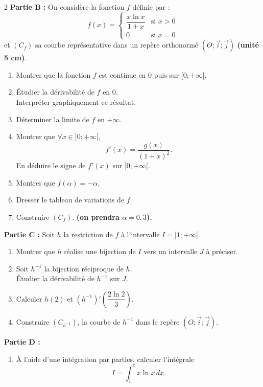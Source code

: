 \documentclass[12pt,a4paper]{article}
\begin{document}
\begin{multicols}{2}
\textbf{Partie B :} On considère la fonction \( f \) définie par :
\[
f(x) = 
\begin{cases}
\dfrac{x \ln x}{1 + x} & \text{si } x > 0 \\
0 & \text{si } x = 0
\end{cases}
\]
et \( (C_f) \) sa courbe représentative dans un repère orthonormé \( (O ; \vec{i} ; \vec{j}) \) \textbf{(unité 5 cm)}.

\begin{enumerate}
    \item Montrer que la fonction \( f \) est continue en 0 puis sur \( [0 ; +\infty[ \).
    \item Étudier la dérivabilité de \( f \) en 0.\\
    Interpréter graphiquement ce résultat.
    \item Déterminer la limite de \( f \) en \( +\infty \).
    \item Montrer que \( \forall x \in ]0 ; +\infty[ \),
    \[
    f'(x) = \dfrac{g(x)}{(1 + x)^2}.
    \]
    En déduire le signe de \( f'(x) \) sur \( ]0 ; +\infty[ \).
    \item Montrer que \( f(\alpha) = -\alpha \).
    \item Dresser le tableau de variations de \( f \).
    \item Construire \( (C_f) \). \textbf{(on prendra \( \alpha = 0{,}3 \)).}
\end{enumerate}
\textbf{Partie C :} Soit \( h \) la restriction de \( f \) à l’intervalle \( I = [1 ; +\infty[ \).

\begin{enumerate}
    \item Montrer que \( h \) réalise une bijection de \( I \) vers un intervalle \( J \) à préciser.
    \item Soit \( h^{-1} \) la bijection réciproque de \( h \).\\
    Étudier la dérivabilité de \( h^{-1} \) sur \( J \).
    \item Calculer \( h(2) \) et \( \left(h^{-1}\right)'\left( \dfrac{2 \ln 2}{3} \right) \).
    \item Construire \( (C_{h^{-1}}) \), la courbe de \( h^{-1} \) dans le repère \( (O ; \vec{i} ; \vec{j}) \).
\end{enumerate}


\textbf{Partie D :}

\begin{enumerate}
    \item À l’aide d’une intégration par parties, calculer l’intégrale 
    \[
    I = \int_1^e x \ln x\,dx.
    \]


\end{enumerate}
\end{multicols}
\end{document}
